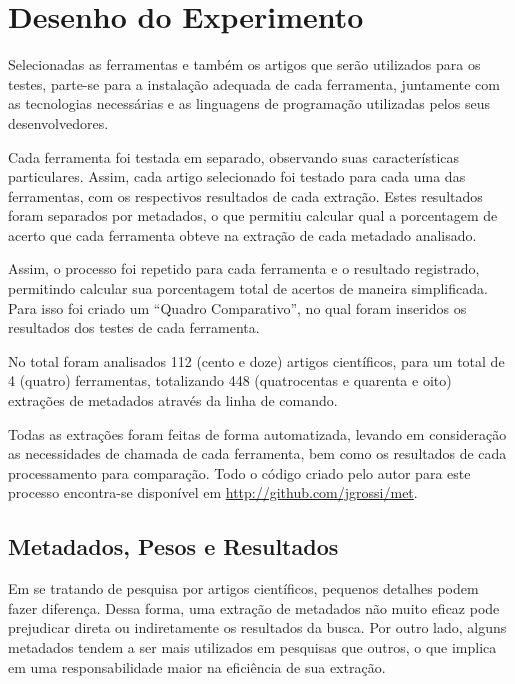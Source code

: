 \section{Desenho do Experimento}
\label{sec:experiment-design}

Selecionadas as ferramentas e também os artigos que serão utilizados para os testes, parte-se para a instalação adequada de cada ferramenta, juntamente com as tecnologias necessárias e as linguagens de programação utilizadas pelos seus desenvolvedores. 

Cada ferramenta foi testada em separado, observando suas características particulares. Assim, cada artigo selecionado foi testado para cada uma das ferramentas, com os respectivos resultados de cada extração. Estes resultados foram separados por metadados, o que permitiu calcular qual a porcentagem de acerto que cada ferramenta obteve na extração de cada metadado analisado.

Assim, o processo foi repetido para cada ferramenta e o resultado registrado, permitindo calcular sua porcentagem total de acertos de maneira simplificada. Para isso foi criado um ``Quadro Comparativo'', no qual foram inseridos os resultados dos testes de cada ferramenta. 

No total foram analisados 112 (cento e doze) artigos científicos, para um total de 4 (quatro) ferramentas, totalizando 448 (quatrocentas e quarenta e oito) extrações de metadados através da linha de comando.

Todas as extrações foram feitas de forma automatizada, levando em consideração as necessidades de chamada de cada ferramenta, bem como os resultados de cada processamento para comparação. Todo o código criado pelo autor para este processo encontra-se disponível em \url{http://github.com/jgrossi/met}.

\subsection{Metadados, Pesos e Resultados}
\label{ssec:metadata-results}


Em se tratando de pesquisa por artigos científicos, pequenos detalhes podem fazer diferença. Dessa forma, uma extração de metadados não muito eficaz pode prejudicar direta ou indiretamente os resultados da busca. Por outro lado, alguns metadados tendem a ser mais utilizados em pesquisas que outros, o que implica em uma responsabilidade maior na eficiência de sua extração. 

